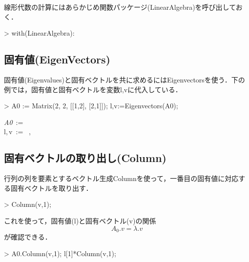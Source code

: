 線形代数の計算にはあらかじめ関数パッケージ(LinearAlgebra)を呼び出しておく．
\begin{MapleInput}
> with(LinearAlgebra):
\end{MapleInput}

\subsection{固有値(EigenVectors)}
固有値(Eigenvalues)と固有ベクトルを共に求めるにはEigenvectorsを使う．下の例では，固有値と固有ベクトルを変数l,vに代入している．
\begin{MapleInput}
> A0 := Matrix(2, 2, [[1,2], [2,1]]); l,v:=Eigenvectors(A0);
\end{MapleInput}
\begin{MapleOutputGather}
{\it A0}\, := \, \left[ \begin {array}{cc} 1&2\\  2&1\end {array} \right] \notag \\
l,\,v\, := \, \left[ \begin {array}{c} -1\\  3\end {array} \right] ,\, \left[ \begin {array}{cc} -1&1\\  1&1\end {array} \right] \notag
\end{MapleOutputGather}
\subsection{固有ベクトルの取り出し(Column)}
行列の列を要素とするベクトル生成Columnを使って，一番目の固有値に対応する固有ベクトルを取り出す．
\begin{MapleInput}
> Column(v,1);
\end{MapleInput}
\begin{MapleOutput}
\left[ \begin {array}{c} -1\\  1\end {array} \right]
\end{MapleOutput}
これを使って，固有値(l)と固有ベクトル(v)の関係
\begin{equation*}
A_0.v=\lambda.v
\end{equation*}
が確認できる．
\begin{MapleInput}
> A0.Column(v,1); l[1]*Column(v,1);
\end{MapleInput}
\begin{MapleOutputGather}
\left[ \begin {array}{c} 1\\  -1\end {array} \right] \notag \\
\left[ \begin {array}{c} 1\\  -1\end {array} \right] \notag
\end{MapleOutputGather}

